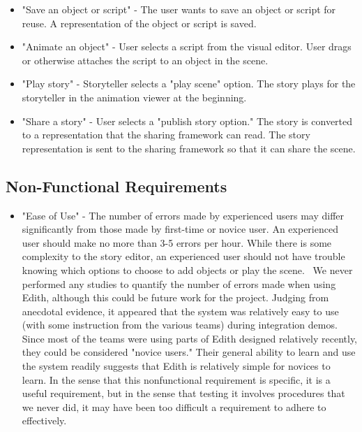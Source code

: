 \documentclass[12pt]{article}
\begin{document}
\begin{itemize}
\item "Save an object or script" - The user wants to save an object or script for reuse. A representation of the object or script is saved.
\item "Animate an object" -  User selects a script from the visual editor. User drags or otherwise attaches the script to an object in the scene.
\item "Play story" - Storyteller selects a "play scene" option. The story plays for the storyteller in the animation viewer at the beginning.
\item "Share a story" - User selects a "publish story option." The story is converted to a representation that the sharing framework can read. The story representation is sent to the sharing framework so that it can share the scene.
\end{itemize}

\subsection{Non-Functional Requirements}
\begin{itemize}
\item "Ease of Use" - 	The number of errors made by experienced users may differ significantly from those made by first-time or novice user. An experienced user should make no more than 3-5 errors per hour. While there is some complexity to the story editor, an experienced user should not have trouble knowing which options to choose to add objects or play the scene.
\ We never performed any studies to quantify the number of errors made when using Edith, although this could be future work for the project. Judging from anecdotal evidence, it appeared that the system was relatively easy to use (with some instruction from the various teams) during integration demos. Since most of the teams were using parts of Edith designed relatively recently, they could be considered "novice users." Their general ability to learn and use the system readily suggests that Edith is relatively simple for novices to learn. In the sense that this nonfunctional requirement is specific, it is a useful requirement, but in the sense that testing it involves procedures that we never did, it may have been too difficult a requirement to adhere to effectively.

\end{itemize}
\end{document}
